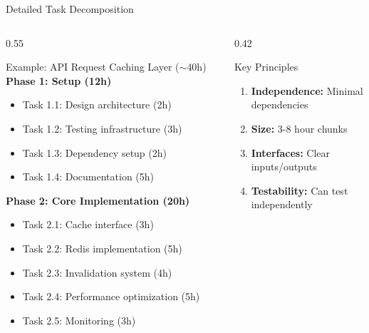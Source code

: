 \documentclass[aspectratio=169,10pt]{beamer}
\begin{document}
\begin{frame}{Detailed Task Decomposition}
    \begin{columns}[T]
        \begin{column}{0.55\textwidth}
            \begin{exampleblock}{Example: API Request Caching Layer ($\sim$40h)}
                \textbf{Phase 1: Setup (12h)}
                \begin{itemize}
                    \item Task 1.1: Design architecture (2h)
                    \item Task 1.2: Testing infrastructure (3h)
                    \item Task 1.3: Dependency setup (2h)
                    \item Task 1.4: Documentation (5h)
                \end{itemize}
                \textbf{Phase 2: Core Implementation (20h)}
                \begin{itemize}
                    \item Task 2.1: Cache interface (3h)
                    \item Task 2.2: Redis implementation (5h)
                    \item Task 2.3: Invalidation system (4h)
                    \item Task 2.4: Performance optimization (5h)
                    \item Task 2.5: Monitoring (3h)
                \end{itemize}
            \end{exampleblock}
        \end{column}
        \begin{column}{0.42\textwidth}
            \begin{block}{Key Principles}
                \begin{enumerate}
                    \item \textbf{Independence:} Minimal dependencies
                    \item \textbf{Size:} 3-8 hour chunks
                    \item \textbf{Interfaces:} Clear inputs/outputs
                    \item \textbf{Testability:} Can test independently
                \end{enumerate}
            \end{block}
            \vspace{0.2cm}

\end{column}
\end{columns}
\end{frame}
\end{document}
